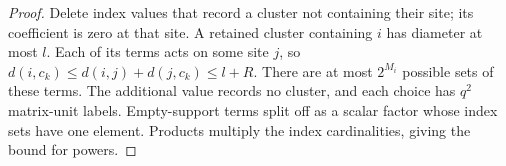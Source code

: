 \begin{proof}\leanok
    Delete index values that record a cluster not containing their site;
    its coefficient is zero at that site. A retained cluster containing $i$
    has diameter at most $l$. Each of its terms acts on some site $j$, so
    $d(i,c_k)\le d(i,j)+d(j,c_k)\le l+R$. There are at most $2^{M_i}$
    possible sets of these terms. The additional value records no cluster,
    and each choice has $q^2$ matrix-unit labels. Empty-support terms split
    off as a scalar factor whose index sets have one element.
    Products multiply the index cardinalities, giving the bound for powers.
\end{proof}

